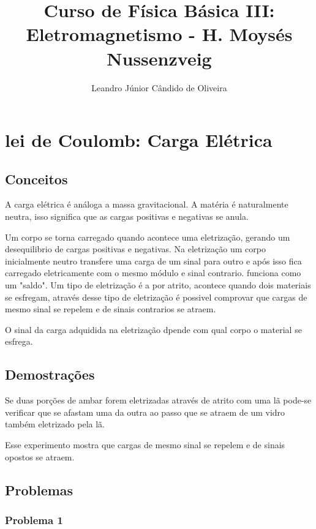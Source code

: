 \documentclass[a4paper, 12pt]{article}
\begin{document}
	\title{Curso de Física Básica III: Eletromagnetismo - H. Moysés Nussenzveig}
	\author{Leandro Júnior Cândido de Oliveira}
	\maketitle
	
	
	\section{lei de Coulomb: Carga Elétrica}
	
	\subsection{Conceitos}
	
	A carga elétrica é análoga a massa gravitacional. A matéria é naturalmente neutra, isso significa que as cargas positivas e negativas se anula.
	
	Um corpo se torna carregado quando acontece uma eletrização, gerando um desequilibrio de cargas positivas e negativas. Na eletrização um corpo inicialmente neutro transfere uma carga de um sinal para outro e após isso fica carregado eletricamente com o mesmo módulo e sinal contrario. funciona como um "saldo". Um tipo de eletrização é a por atrito, acontece quando dois materiais se esfregam, através desse tipo de eletrização é possivel comprovar que cargas de mesmo sinal se repelem e de sinais contrarios se atraem.
	
	O sinal da carga adquidida na eletrização dpende com qual corpo o material se esfrega.
	
	\subsection{Demostrações}
	
	Se duas porções de ambar forem eletrizadas através de atrito com uma lã pode-se verificar que se afastam uma da outra ao passo que se atraem de um vidro também eletrizado pela lã.
	
	Esse experimento mostra que cargas de mesmo sinal se repelem e de sinais opostos se atraem.
	
	\subsection{Problemas}
	
	\subsubsection{Problema 1}
	
\end{document}
